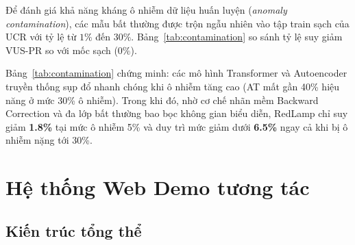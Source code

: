 \documentclass[sigconf,nonacm]{acmart}
\begin{document}
Để đánh giá khả năng kháng ô nhiễm dữ liệu huấn luyện (\textit{anomaly contamination}), các mẫu bất thường được trộn ngẫu nhiên vào tập train sạch của UCR với tỷ lệ từ $1\%$ đến $30\%$. Bảng~\ref{tab:contamination} so sánh tỷ lệ suy giảm VUS-PR so với mốc sạch ($0\%$).

\begin{table}[htbp]
\centering
\caption{Tỷ lệ suy giảm VUS-PR (\%) trên tập UCR khi tăng mức độ ô nhiễm dữ liệu huấn luyện}
\label{tab:contamination}
\footnotesize
{}
\end{table}

Bảng~\ref{tab:contamination} chứng minh: các mô hình Transformer và Autoencoder truyền thống sụp đổ nhanh chóng khi ô nhiễm tăng cao (AT mất gần 40\% hiệu năng ở mức 30\% ô nhiễm). Trong khi đó, nhờ cơ chế nhãn mềm Backward Correction và đa lớp bất thường bao bọc không gian biểu diễn, RedLamp chỉ suy giảm \textbf{1.8\%} tại mức ô nhiễm 5\% và duy trì mức giảm dưới \textbf{6.5\%} ngay cả khi bị ô nhiễm nặng tới 30\%.

\section{Hệ thống Web Demo tương tác}

\subsection{Kiến trúc tổng thể}
\end{document}
